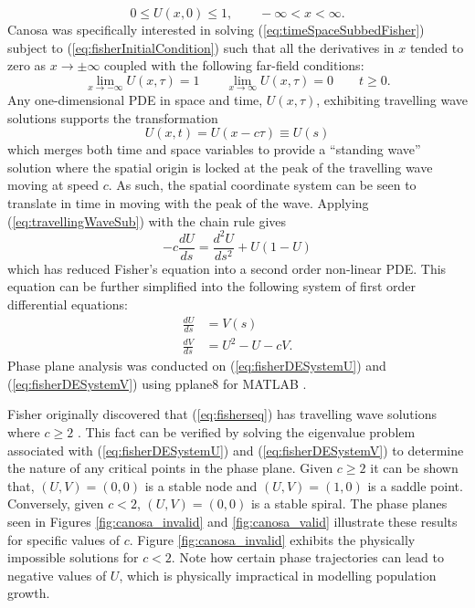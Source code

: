 \documentclass[11pt,titlepage,a4paper]{article}
\begin{document}
		\begin{equation}
			 \label{eq:fisherInitialCondition}
			 0 \le U(x, 0) \le 1, \qquad -\infty < x < \infty.
		\end{equation}
		Canosa \cite{canosa1973nonlinear} was specifically interested in solving (\ref{eq:timeSpaceSubbedFisher}) subject to (\ref{eq:fisherInitialCondition}) such that all the derivatives in $x$ tended to zero as $x \to \pm \infty$ coupled with the following far-field conditions:
		\begin{equation}
			 \label{eq:fisherBoundaryCondition}
			 \lim_{x\to -\infty} U(x,\tau) = 1 \qquad \lim_{x\to \infty} U(x,\tau) = 0 \qquad t \ge 0.
		\end{equation}
		Any one-dimensional PDE in space and time, $U(x,\tau)$, exhibiting travelling wave solutions supports the transformation
		\begin{equation}
			 \label{eq:travellingWaveSub}
			 U(x,t) = U(x - c\tau) \equiv U(s)
		\end{equation}
		which merges both time and space variables to provide a ``standing wave'' solution where the spatial origin is locked at the peak of the travelling wave moving at speed $c$. As such, the spatial coordinate system can be seen to translate in time in moving with the peak of the wave. Applying (\ref{eq:travellingWaveSub}) with the chain rule gives
		\begin{equation*}
			 -c \frac{d U}{d s} = \frac{d^2 U}{d s^2} + U(1 - U)
		\end{equation*}
		which has reduced Fisher's equation into a second order non-linear PDE. This equation can be further simplified into the following system of first order differential equations:
		\begin{align}
			 \label{eq:fisherDESystemU}
			 \frac{d U}{d s} &= V(s) \\
			 \label{eq:fisherDESystemV}
			 \frac{d V}{d s} &= U^2 - U - cV.
		\end{align}
		Phase plane analysis was conducted on (\ref{eq:fisherDESystemU}) and (\ref{eq:fisherDESystemV}) using pplane8 for MATLAB \cite{pplane8}. 
		
		Fisher originally discovered that (\ref{eq:fisherseq}) has travelling wave solutions where $c \ge 2$ \cite{canosa1973nonlinear}. This fact can be verified by solving the eigenvalue problem associated with (\ref{eq:fisherDESystemU}) and (\ref{eq:fisherDESystemV}) to determine the nature of any critical points in the phase plane. Given $c \ge 2$ it can be shown that, $(U, V) = (0, 0)$ is a stable node and $(U, V) = (1, 0)$ is a saddle point. Conversely, given $c < 2$, $(U, V) = (0, 0)$ is a stable spiral. The phase planes seen in Figures \ref{fig:canosa_invalid} and \ref{fig:canosa_valid} illustrate these results for specific values of $c$. Figure \ref{fig:canosa_invalid} exhibits the physically impossible solutions for $c < 2$. Note how certain phase trajectories can lead to negative values of $U$, which is physically impractical in modelling population growth.
\end{document}
